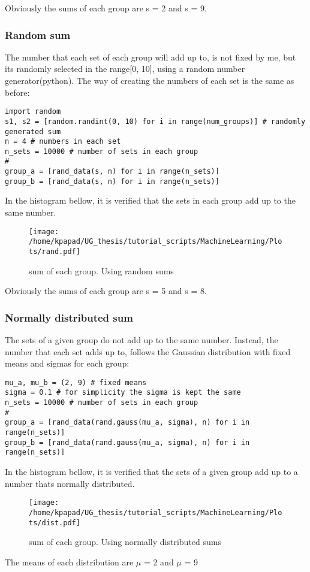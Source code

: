 \documentclass[11pt,a4paper]{article}
\begin{document}
Obviously the sums of each group are s = 2 and s = 9.
\subsubsection{Random sum}
\label{sec:orgaa7bc0c}
The number that each set of each group will add up to, is not fixed by me, but its randomly selected in the range[0, 10], using a random number generator(python). The way of creating the numbers of each set is the same as before:
\begin{verbatim}
import random
s1, s2 = [random.randint(0, 10) for i in range(num_groups)] # randomly generated sum
n = 4 # numbers in each set
n_sets = 10000 # number of sets in each group
#
group_a = [rand_data(s, n) for i in range(n_sets)]
group_b = [rand_data(s, n) for i in range(n_sets)]
\end{verbatim}
In the histogram bellow, it is verified that the sets in each group add up to the same number.
\begin{figure}[htbp]
\centering
\texttt{[image: /home/kpapad/UG\_thesis/tutorial\_scripts/MachineLearning/Plots/rand.pdf]}
\caption{\label{fig:org62d0142}sum of each group. Using random sums}
\end{figure}
Obviously the sums of each group are s = 5 and s = 8.
\newpage
\subsubsection{Normally distributed sum}
\label{sec:orgbf2f2a5}
The sets of a given group do not add up to the same number. Instead, the number that each set adds up to, follows the Gaussian distribution with fixed means and sigmas for each group:
\begin{verbatim}
mu_a, mu_b = (2, 9) # fixed means
sigma = 0.1 # for simplicity the sigma is kept the same
n_sets = 10000 # number of sets in each group
#
group_a = [rand_data(rand.gauss(mu_a, sigma), n) for i in range(n_sets)]
group_b = [rand_data(rand.gauss(mu_a, sigma), n) for i in range(n_sets)]
\end{verbatim}
In the histogram bellow, it is verified that the sets of a given group add up to a number thats normally distributed.
\begin{figure}[htbp]
\centering
\texttt{[image: /home/kpapad/UG\_thesis/tutorial\_scripts/MachineLearning/Plots/dist.pdf]}
\caption{\label{fig:org8df7416}sum of each group. Using normally distributed sums}
\end{figure}
The means of each distribution are \(\mu\) = 2 and \(\mu\) = 9 
\end{document}
